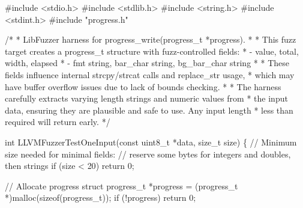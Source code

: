 \documentclass[
  a4paper,
]{scrreprt}
\newenvironment{Shaded}{\begin{snugshade}}{\end{snugshade}}
\newcommand{\CommentTok}[1]{\textcolor[rgb]{0.41,0.41,0.41}{#1}}
\newcommand{\ControlFlowTok}[1]{\textcolor[rgb]{0.85,0.12,0.09}{#1}}
\newcommand{\DataTypeTok}[1]{\textcolor[rgb]{0.47,0.16,0.63}{#1}}
\newcommand{\DecValTok}[1]{\textcolor[rgb]{0.47,0.16,0.63}{#1}}
\newcommand{\ImportTok}[1]{\textcolor[rgb]{0.33,0.33,0.33}{#1}}
\newcommand{\KeywordTok}[1]{\textcolor[rgb]{0.85,0.12,0.09}{#1}}
\newcommand{\NormalTok}[1]{\textcolor[rgb]{0.33,0.33,0.33}{#1}}
\newcommand{\OperatorTok}[1]{\textcolor[rgb]{0.00,0.46,0.62}{#1}}
\newcommand{\PreprocessorTok}[1]{\textcolor[rgb]{0.47,0.16,0.63}{#1}}
\theoremstyle{definition}
\theoremstyle{remark}
\begin{document}
\begin{Shaded}
\begin{Highlighting}[numbers=left,,]
\PreprocessorTok{\#include }\ImportTok{\textless{}stdio.h\textgreater{}}
\PreprocessorTok{\#include }\ImportTok{\textless{}stdlib.h\textgreater{}}
\PreprocessorTok{\#include }\ImportTok{\textless{}string.h\textgreater{}}
\PreprocessorTok{\#include }\ImportTok{\textless{}stdint.h\textgreater{}}
\PreprocessorTok{\#include }\ImportTok{"progress.h"}

\CommentTok{/*}
\CommentTok{ * LibFuzzer harness for progress\_write(progress\_t *progress).}
\CommentTok{ *}
\CommentTok{ * This fuzz target creates a progress\_t structure with fuzz{-}controlled fields:}
\CommentTok{ * {-} value, total, width, elapsed}
\CommentTok{ * {-} fmt string, bar\_char string, bg\_bar\_char string}
\CommentTok{ *}
\CommentTok{ * These fields influence internal strcpy/strcat calls and replace\_str usage,}
\CommentTok{ * which may have buffer overflow issues due to lack of bounds checking.}
\CommentTok{ * }
\CommentTok{ * The harness carefully extracts varying length strings and numeric values from}
\CommentTok{ * the input data, ensuring they are plausible and safe to use. Any input length}
\CommentTok{ * less than required will return early.}
\CommentTok{ */}

\DataTypeTok{int}\NormalTok{ LLVMFuzzerTestOneInput}\OperatorTok{(}\DataTypeTok{const} \DataTypeTok{uint8\_t} \OperatorTok{*}\NormalTok{data}\OperatorTok{,} \DataTypeTok{size\_t}\NormalTok{ size}\OperatorTok{)} \OperatorTok{\{}
    \CommentTok{// Minimum size needed for minimal fields:}
    \CommentTok{// reserve some bytes for integers and doubles, then strings}
    \ControlFlowTok{if} \OperatorTok{(}\NormalTok{size }\OperatorTok{\textless{}} \DecValTok{20}\OperatorTok{)} \ControlFlowTok{return} \DecValTok{0}\OperatorTok{;}

    \CommentTok{// Allocate progress struct}
\NormalTok{    progress\_t }\OperatorTok{*}\NormalTok{progress }\OperatorTok{=} \OperatorTok{(}\NormalTok{progress\_t }\OperatorTok{*)}\NormalTok{malloc}\OperatorTok{(}\KeywordTok{sizeof}\OperatorTok{(}\NormalTok{progress\_t}\OperatorTok{));}
    \ControlFlowTok{if} \OperatorTok{(!}\NormalTok{progress}\OperatorTok{)} \ControlFlowTok{return} \DecValTok{0}\OperatorTok{;}


\end{Highlighting}
\end{Shaded}
\end{document}
